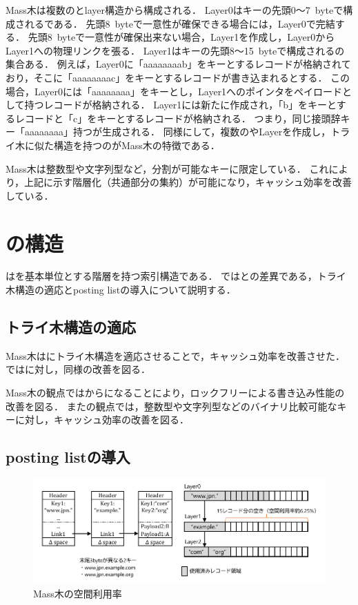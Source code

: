Mass木は複数の\Bptree{}とlayer構造から構成される．
Layer0はキーの先頭0～7~byteで構成される\Bptree{}である．
先頭8~byteで一意性が確保できる場合には，Layer0で完結する．
先頭8~byteで一意性が確保出来ない場合，Layer1を作成し，Layer0からLayer1への物理リンクを張る．
Layer1はキーの先頭8～15~byteで構成される\Bptree{}の集合ある．
例えば，Layer0に「aaaaaaaab」をキーとするレコードが格納されており，そこに「aaaaaaaac」をキーとするレコードが書き込まれるとする．
この場合，Layer0には「aaaaaaaa」をキーとし，Layer1へのポインタをペイロードとして持つレコードが格納される．
Layer1には新たに\Bptree{}作成され，「b」をキーとするレコードと「c」をキーとするレコードが格納される．
つまり，同じ接頭辞キー「aaaaaaaa」持つ\Bptree{}が生成される．
同様にして，複数の\Bptree{}やLayerを作成し，トライ木に似た構造を持つのがMass木の特徴である．

Mass木は整数型や文字列型など，分割が可能なキーに限定している．
これにより，上記に示す階層化（共通部分の集約）が可能になり，キャッシュ効率を改善している．

\section{\Bcforest{}の構造}
\label{sec:bc_forest_structure}

\Bcforest{}は\Bctree{}を基本単位とする階層を持つ索引構造である．
\Sec{\ref{sec:bc_forest_structure}}では\Bctree{}との差異である，トライ木構造の適応とposting listの導入について説明する．

\subsection{トライ木構造の適応}

Mass木は\Bptree{}にトライ木構造を適応させることで，キャッシュ効率を改善させた．
\Bcforest{}では\Bctree{}に対し，同様の改善を図る．

Mass木の観点では\Bptree{}から\Bctree{}になることにより，ロックフリーによる書き込み性能の改善を図る．
また\Bctree{}の観点では，整数型や文字列型などのバイナリ比較可能なキーに対し，キャッシュ効率の改善を図る．

\subsection{posting listの導入}

\begin{figure}[t]
    \centering
    \includegraphics{./figures/memory.pdf}
    \caption{Mass木の空間利用率}
    \label{fig:memory}
\end{figure}

